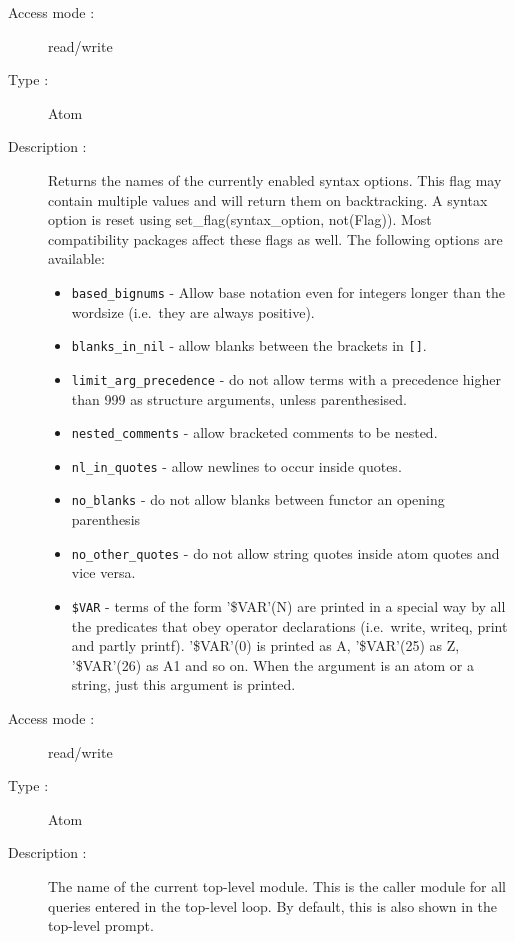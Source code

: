 \begin{description}
\pagebreak[3]
\begin{description}
\item[Access mode : ] read/write
\item[Type : ] Atom
\item[Description : ] Returns the names of the currently enabled syntax options.
This flag may contain multiple values and will return them on backtracking.
A syntax option is reset using set_flag(syntax_option, not(Flag)).
Most compatibility packages affect these flags as well.
The following options are available:
\begin{itemize}
\item {\tt based_bignums} - Allow base notation even for integers
longer than the wordsize (i.e.\ they are always positive).
\item {\tt blanks_in_nil} - allow blanks between the brackets in {\tt []}.
\item {\tt limit_arg_precedence} - do not allow terms with a precedence higher
than 999 as structure arguments, unless parenthesised.
\item {\tt nested_comments} - allow bracketed comments to be nested.
\item {\tt nl_in_quotes} - allow newlines to occur inside quotes.
\item {\tt no_blanks} - do not allow blanks between functor an opening
parenthesis
\item {\tt no_other_quotes} - do not allow string quotes inside atom quotes
and vice versa.
\item {\tt \$VAR} - terms of the form '\$VAR'(N) are printed in a special way by all the predicates that obey operator declarations (i.e.\ write, writeq, print and partly printf). '\$VAR'(0) is printed as A, '\$VAR'(25) as Z, '\$VAR'(26) as A1 and so on.
When the argument is an atom or a string, just this argument is printed.
\end{itemize}
\end{description}

\begin{description}
\item[Access mode : ] read/write
\item[Type : ] Atom
\item[Description : ] The name of the current top-level module. This is the
caller module for all queries entered in the top-level loop.
By default, this is also shown in the top-level prompt.
\end{description}


\end{description}
